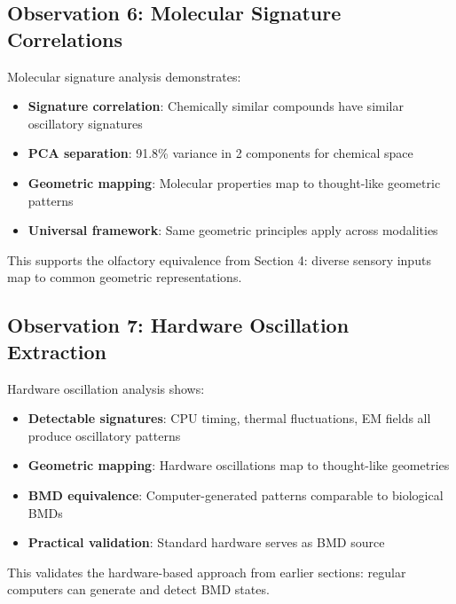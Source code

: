 \subsection{Observation 6: Molecular Signature Correlations}



\begin{observation}
\label{obs:cross_modal}
Molecular signature analysis demonstrates:
\begin{itemize}
\item \textbf{Signature correlation}: Chemically similar compounds have similar oscillatory signatures
\item \textbf{PCA separation}: 91.8\% variance in 2 components for chemical space
\item \textbf{Geometric mapping}: Molecular properties map to thought-like geometric patterns
\item \textbf{Universal framework}: Same geometric principles apply across modalities
\end{itemize}
\end{observation}

This supports the olfactory equivalence from Section 4: diverse sensory inputs map to common geometric representations.

\subsection{Observation 7: Hardware Oscillation Extraction}

\begin{observation}
\label{obs:hardware}
Hardware oscillation analysis shows:
\begin{itemize}
\item \textbf{Detectable signatures}: CPU timing, thermal fluctuations, EM fields all produce oscillatory patterns
\item \textbf{Geometric mapping}: Hardware oscillations map to thought-like geometries
\item \textbf{BMD equivalence}: Computer-generated patterns comparable to biological BMDs
\item \textbf{Practical validation}: Standard hardware serves as BMD source
\end{itemize}
\end{observation}

This validates the hardware-based approach from earlier sections: regular computers can generate and detect BMD states.

